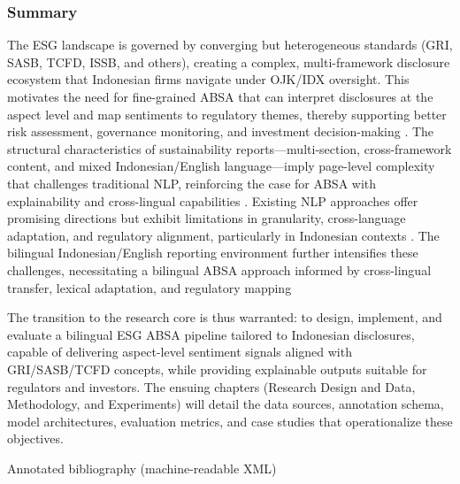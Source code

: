 \subsubsection{Summary}
The ESG landscape is governed by converging but heterogeneous standards (GRI, SASB, TCFD, ISSB, and others), creating a complex, multi-framework disclosure ecosystem that Indonesian firms navigate under OJK/IDX oversight. This motivates the need for fine-grained ABSA that can interpret disclosures at the aspect level and map sentiments to regulatory themes, thereby supporting better risk assessment, governance monitoring, and investment decision-making \cite{10.1108/medar-11-2020-1097,10.20900/jsr20210006,10.1108/aaaj-06-2021-5330,10.1108/aaaj-02-2020-4445}. The structural characteristics of sustainability reports—multi-section, cross-framework content, and mixed Indonesian/English language—imply page-level complexity that challenges traditional NLP, reinforcing the case for ABSA with explainability and cross-lingual capabilities \cite{10.1111/ablj.12210,10.1111/jacf.12411,10.1016/j.cpa.2021.102309,10.1111/1911-3838.12232}. Existing NLP approaches offer promising directions but exhibit limitations in granularity, cross-language adaptation, and regulatory alignment, particularly in Indonesian contexts \cite{10.1002/csr.70089,10.69593/ajbais.v4i04.130,10.1111/eufm.12509,10.3390/math12193119}. The bilingual Indonesian/English reporting environment further intensifies these challenges, necessitating a bilingual ABSA approach informed by cross-lingual transfer, lexical adaptation, and regulatory mapping \cite{10.1016/j.inffus.2025.103073,10.1111/eufm.12509,10.48550/arxiv.2511.00024}

The transition to the research core is thus warranted: to design, implement, and evaluate a bilingual ESG ABSA pipeline tailored to Indonesian disclosures, capable of delivering aspect-level sentiment signals aligned with GRI/SASB/TCFD concepts, while providing explainable outputs suitable for regulators and investors. The ensuing chapters (Research Design and Data, Methodology, and Experiments) will detail the data sources, annotation schema, model architectures, evaluation metrics, and case studies that operationalize these objectives.

Annotated bibliography (machine-readable XML)